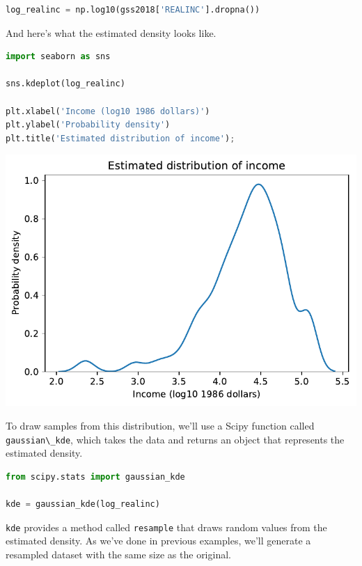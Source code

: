 \begin{lstlisting}[language=Python]
log_realinc = np.log10(gss2018['REALINC'].dropna())
\end{lstlisting}

And here's what the estimated density looks like.

\begin{lstlisting}[language=Python]
import seaborn as sns

sns.kdeplot(log_realinc)

plt.xlabel('Income (log10 1986 dollars)')
plt.ylabel('Probability density')
plt.title('Estimated distribution of income');
\end{lstlisting}

\begin{center}
\includegraphics[scale=0.75]{chapters/12_bootstrap_files/12_bootstrap_115_0.pdf}
\end{center}

To draw samples from this distribution, we'll use a Scipy function
called \passthrough{\lstinline!gaussian\_kde!}, which takes the data and
returns an object that represents the estimated density.

\begin{lstlisting}[language=Python]
from scipy.stats import gaussian_kde

kde = gaussian_kde(log_realinc)
\end{lstlisting}

\passthrough{\lstinline!kde!} provides a method called
\passthrough{\lstinline!resample!} that draws random values from the
estimated density. As we've done in previous examples, we'll generate a
resampled dataset with the same size as the original.

